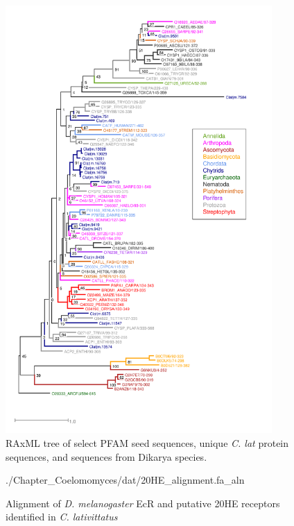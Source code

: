 \begin{figure}[hb]
  \centering
  \includegraphics[width=4in]{./Chapter_Coelomomyces/img/PF00112_tree.png}
  \caption[Maximum likelihood tree for PF00112 Cysteine protease proteins in \textit{C. lat} and others.]{RAxML tree of select PFAM seed sequences, unique \textit{C. lat} protein sequences, and sequences from Dikarya species.}
  \label{fig:ChClat_PF00112}
\end{figure}


\begin{figure}[hb]
  \centering
  \begin{texshade}{./Chapter_Coelomomyces/dat/20HE_alignment.fa_aln}
    \hideconsensus
  \end{texshade}
  \caption[20HE alignment]{Alignment of \textit{D. melanogaster} EcR and putative 20HE receptors identified in \textit{C. lativittatus} }
  \label{fig:ChClat_20HEalign}
\end{figure}
